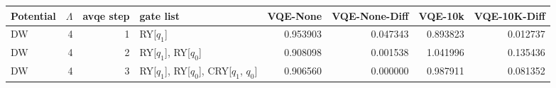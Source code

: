 \begin{tabular}{lrrlrrrr}
\toprule
Potential & $\Lambda$ & avqe step & gate list & VQE-None & VQE-None-Diff & VQE-10k & VQE-10K-Diff \\
\midrule
DW & 4 & 1 & RY[$q_1$] & 0.953903 & 0.047343 & 0.893823 & 0.012737 \\
DW & 4 & 2 & RY[$q_1$], RY[$q_0$] & 0.908098 & 0.001538 & 1.041996 & 0.135436 \\
DW & 4 & 3 & RY[$q_1$], RY[$q_0$], CRY[$q_1$, $q_0$] & 0.906560 & 0.000000 & 0.987911 & 0.081352 \\
\bottomrule
\end{tabular}
